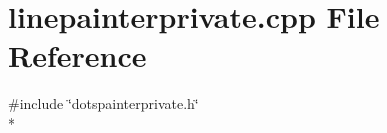 \section{linepainterprivate.\+cpp File Reference}
\label{curve_2painters_2linepainterprivate_8cpp}
{\ttfamily \#include \char`\"{}dotspainterprivate.\+h\char`\"{}}\\*
